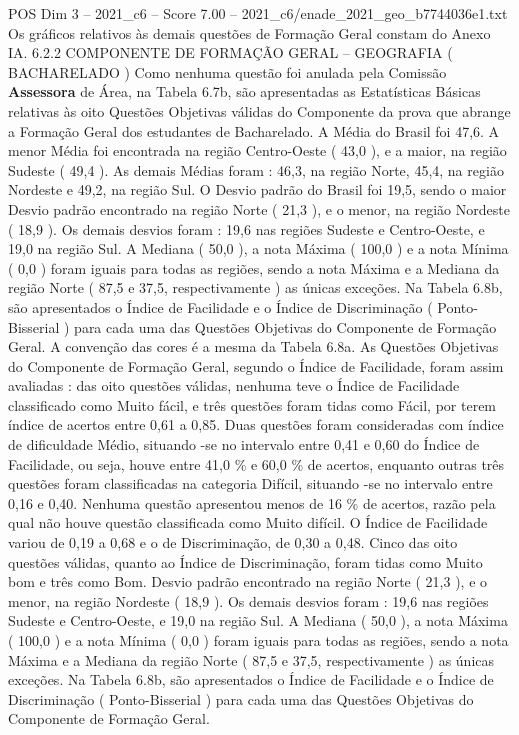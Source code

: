 \begin{textsample}{POS Dim 3 – 2021\_c6 – Score 7.00 – 2021\_c6/enade\_2021\_geo\_b7744036e1.txt}
Os gráficos relativos às demais questões de Formação Geral constam do Anexo IA. 6.2.2 COMPONENTE DE FORMAÇÃO GERAL – GEOGRAFIA ( BACHARELADO ) Como nenhuma questão foi anulada pela Comissão \textbf{Assessora} de Área, na Tabela 6.7b, são apresentadas as Estatísticas Básicas relativas às oito Questões Objetivas válidas do Componente da prova que abrange a Formação Geral dos estudantes de Bacharelado.
A Média do Brasil foi 47,6.
A menor Média foi encontrada na região Centro-Oeste ( 43,0 ), e a maior, na região Sudeste ( 49,4 ).
As demais Médias foram : 46,3, na região Norte, 45,4, na região Nordeste e 49,2, na região Sul.
O Desvio padrão do Brasil foi 19,5, sendo o maior Desvio padrão encontrado na região Norte ( 21,3 ), e o menor, na região Nordeste ( 18,9 ).
Os demais desvios foram : 19,6 nas regiões Sudeste e Centro-Oeste, e 19,0 na região Sul.
A Mediana ( 50,0 ), a nota Máxima ( 100,0 ) e a nota Mínima ( 0,0 ) foram iguais para todas as regiões, sendo a nota Máxima e a Mediana da região Norte ( 87,5 e 37,5, respectivamente ) as únicas exceções.
Na Tabela 6.8b, são apresentados o Índice de Facilidade e o Índice de Discriminação ( Ponto-Bisserial ) para cada uma das Questões Objetivas do Componente de Formação Geral.
A convenção das cores é a mesma da Tabela 6.8a.
As Questões Objetivas do Componente de Formação Geral, segundo o Índice de Facilidade, foram assim avaliadas : das oito questões válidas, nenhuma teve o Índice de Facilidade classificado como Muito fácil, e três questões foram tidas como Fácil, por terem índice de acertos entre 0,61 a 0,85.
Duas questões foram consideradas com índice de dificuldade Médio, situando -se no intervalo entre 0,41 e 0,60 do Índice de Facilidade, ou seja, houve entre 41,0 \% e 60,0 \% de acertos, enquanto outras três questões foram classificadas na categoria Difícil, situando -se no intervalo entre 0,16 e 0,40.
Nenhuma questão apresentou menos de 16 \% de acertos, razão pela qual não houve questão classificada como Muito difícil.
O Índice de Facilidade variou de 0,19 a 0,68 e o de Discriminação, de 0,30 a 0,48.
Cinco das oito questões válidas, quanto ao Índice de Discriminação, foram tidas como Muito bom e três como Bom.
Desvio padrão encontrado na região Norte ( 21,3 ), e o menor, na região Nordeste ( 18,9 ).
Os demais desvios foram : 19,6 nas regiões Sudeste e Centro-Oeste, e 19,0 na região Sul.
A Mediana ( 50,0 ), a nota Máxima ( 100,0 ) e a nota Mínima ( 0,0 ) foram iguais para todas as regiões, sendo a nota Máxima e a Mediana da região Norte ( 87,5 e 37,5, respectivamente ) as únicas exceções.
Na Tabela 6.8b, são apresentados o Índice de Facilidade e o Índice de Discriminação ( Ponto-Bisserial ) para cada uma das Questões Objetivas do Componente de Formação Geral.

\end{textsample}
